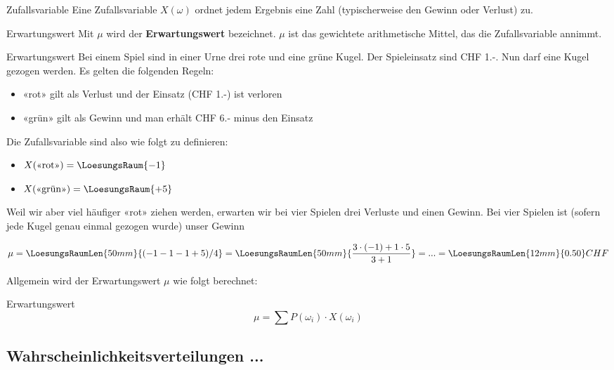 \begin{definition}{Zufallsvariable}{}
	Eine Zufallsvariable $X(\omega)$ ordnet jedem Ergebnis eine Zahl
	(typischerweise den Gewinn oder Verlust) zu.
\end{definition}


\begin{definition}{Erwartungswert}{}
	Mit $\mu$ wird der \textbf{Erwartungswert} bezeichnet.
	$\mu$ ist das gewichtete arithmetische Mittel, das die Zufallsvariable
	annimmt.
\end{definition}

\begin{beispiel}{Erwartungswert}{}
  Bei einem Spiel sind in einer Urne drei rote und eine grüne
  Kugel. Der Spieleinsatz sind CHF 1.-. Nun darf eine Kugel gezogen
  werden. Es gelten die folgenden Regeln:
  \begin{itemize}
  \item «rot» gilt als Verlust und der Einsatz (CHF 1.-) ist verloren
  \item «grün» gilt als Gewinn und man erhält CHF 6.- minus den Einsatz
  \end{itemize}
  Die Zufallsvariable sind also wie folgt zu definieren:
  \begin{itemize}
  \item $X(\text{«rot»}) = \LoesungsRaum{-1}$
  \item $X(\text{«grün»}) = \LoesungsRaum{+5}$
  \end{itemize}

  Weil wir aber viel häufiger «rot» ziehen werden, erwarten wir bei
  vier Spielen drei Verluste und einen Gewinn. Bei vier Spielen ist
  (sofern jede Kugel genau einmal gezogen wurde) unser Gewinn

  $$ \mu = \LoesungsRaumLen{50mm}{( -1 -1 -1 + 5) / 4} = \LoesungsRaumLen{50mm}{\frac{3\cdot{}(-1) + 1\cdot{}5}{3+1}}
  = ... = \LoesungsRaumLen{12mm}{0.50} CHF$$
\end{beispiel}

Allgemein wird der Erwartungswert $\mu$ wie folgt berechnet:

\begin{gesetz}{Erwartungswert}{}
$$\mu = \sum P(\omega_i)\cdot{} X(\omega_i)$$
\end{gesetz}


\newpage



\subsection{Wahrscheinlichkeitsverteilungen ...}

